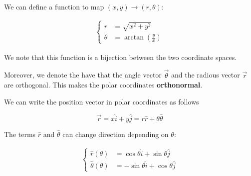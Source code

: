 \documentclass[14pt]{extarticle}
\begin{document}
We can define a function to map $(x, y) \to (r, \theta)$:

\begin{align*}
  \begin{cases}
    r      & = \sqrt{x^2 + y^2}                \\
    \theta & = \arctan\left(\frac{y}{x}\right)
  \end{cases}
\end{align*}

We note that this function is a bijection between the two coordinate spaces.

Moreover, we denote the have that the angle vector $\vec \theta$
and the radious vector $\vec r$ are orthogonal. This makes the polar coordinates \textbf{orthonormal}.

\begin{center}
\end{center}

We can write the position vector in polar coordinates as follows

$$
  \vec r = x \hat i + y \hat j = r \hat r + \theta \hat \theta
$$

The terms $\hat r$ and $\hat \theta$ can change direction depending on $\theta$:

\begin{align*}
  \begin{cases}
    \hat r(\theta)      & = \cos \theta \hat i + \sin \theta \hat j   \\
    \hat \theta(\theta) & = - \sin \theta \hat i + \cos \theta \hat j
  \end{cases}
\end{align*}
\end{document}
